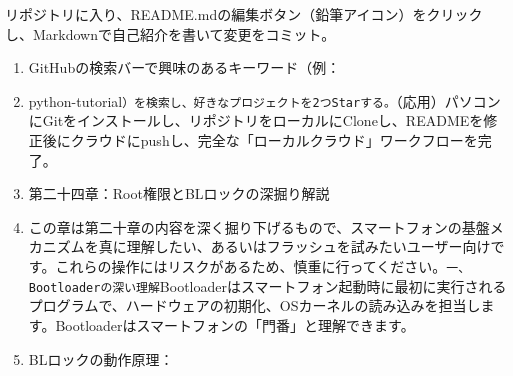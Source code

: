 \begin{tcbpractice}{リポジトリに入り、README.mdの編集ボタン（鉛筆アイコン）をクリックし、Markdownで自己紹介を書いて変更をコミット。}
\begin{enumerate}
  \item GitHubの検索バーで興味のあるキーワード（例：
  \item python-tutorial\texttt{）を検索し、好きなプロジェクトを2つStarする。}（応用）パソコンにGitをインストールし、リポジトリをローカルにCloneし、READMEを修正後にクラウドにpushし、完全な「ローカルクラウド」ワークフローを完了。
  \item 第二十四章：Root権限とBLロックの深掘り解説
  \item この章は第二十章の内容を深く掘り下げるもので、スマートフォンの基盤メカニズムを真に理解したい、あるいはフラッシュを試みたいユーザー向けです。これらの操作にはリスクがあるため、慎重に行ってください。\texttt{一、Bootloaderの深い理解}Bootloaderはスマートフォン起動時に最初に実行されるプログラムで、ハードウェアの初期化、OSカーネルの読み込みを担当します。Bootloaderはスマートフォンの「門番」と理解できます。
  \item BLロックの動作原理：
\end{enumerate}

\end{tcbpractice}
